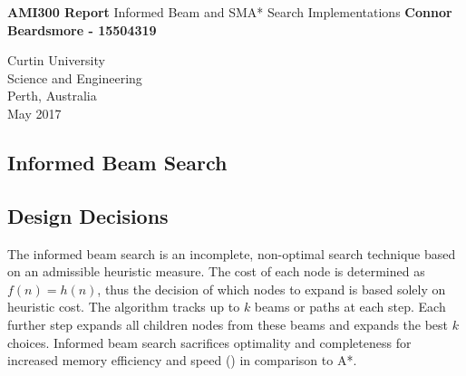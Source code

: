 \documentclass[]{article}
\begin{document}


	

\begin{titlepage}
	\begin{center}
		\vspace*{1cm}
		\LARGE\textbf{AMI300 Report} \vspace{0.5cm}
		\break
	    Informed Beam and SMA* Search Implementations
		\vspace{1cm}
		\break
		\Large\textbf{Connor Beardsmore - 15504319} 
		\vspace{15cm}

		\normalsize
		Curtin University \\
		Science and Engineering \\
		Perth, Australia \\
	    May 2017
	    
	\end{center}
\end{titlepage}


\vspace*{-0.8cm}
\begin{center}
	\section*{Informed Beam Search}
\end{center}

\vspace*{0.8cm}
\subsection*{Design Decisions}

The informed beam search is an incomplete, non-optimal search technique based on an admissible heuristic measure. The cost of each node is determined as $f(n)=h(n)$, thus the decision of which nodes to expand is based solely on heuristic cost. The algorithm tracks up to $k$ beams or paths at each step. Each further step expands all children nodes from these beams and expands the best $k$ choices. Informed beam search sacrifices optimality and completeness for increased memory efficiency and speed (\cite{winston}) in comparison to A*.\\
\end{document}
